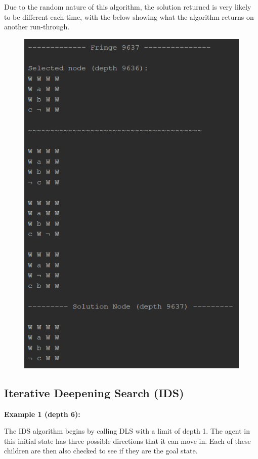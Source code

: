\documentclass{article}
\begin{document}
	\newpage
	Due to the random nature of this algorithm, the solution returned is very likely to be different each time, with the below showing what the algorithm returns on another run-through.
	
	\begin{figure}[h]	
		\centering
		\includegraphics[height=0.6\textheight,keepaspectratio]{DFS-2-5.png}
	\end{figure}
	
	\newpage
	\subsection{Iterative Deepening Search (IDS)}
	\textbf{Example 1 (depth 6):}
	
	The IDS algorithm begins by calling DLS with a limit of depth 1. The agent in this initial state has three possible directions that it can move in. Each of these children are then also checked to see if they are the goal state.
	
\end{document}
